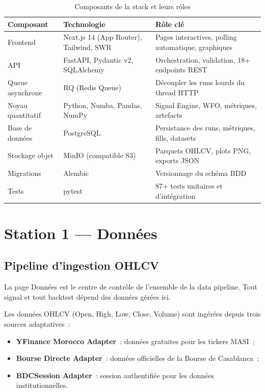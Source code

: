 \begin{table}[H]
\centering
\caption{Composants de la stack et leurs rôles}
\label{tab:stack_detail}
\begin{tabularx}{\linewidth}{@{}lYY@{}}
\toprule
\textbf{Composant}        & \textbf{Technologie}             & \textbf{Rôle clé} \\
\midrule
Frontend                  & Next.js 14 (App Router), Tailwind, SWR & Pages interactives, polling automatique, graphiques \\
API                       & FastAPI, Pydantic v2, SQLAlchemy & Orchestration, validation, 18+ endpoints REST \\
Queue asynchrone          & RQ (Redis Queue)                 & Découpler les runs lourds du thread HTTP \\
Noyau quantitatif         & Python, Numba, Pandas, NumPy     & Signal Engine, WFO, métriques, artefacts \\
Base de données           & PostgreSQL                       & Persistance des runs, métriques, fills, datasets \\
Stockage objet            & MinIO (compatible S3)            & Parquets OHLCV, plots PNG, exports JSON \\
Migrations                & Alembic                          & Versionnage du schéma BDD \\
Tests                     & pytest                           & 87+ tests unitaires et d'intégration \\
\bottomrule
\end{tabularx}
\end{table}

\section{Station 1 --- Données}
\label{sec:station_data}

\subsection{Pipeline d'ingestion OHLCV}

La page Données est le centre de contrôle de l'ensemble de la data pipeline.
Tout signal et tout backtest dépend des données gérées ici.

Les données OHLCV (Open, High, Low, Close, Volume) sont ingérées depuis trois
sources adaptatives~:

\begin{itemize}
    \item \textbf{YFinance Morocco Adapter}~: données gratuites pour les tickers MASI~;
    \item \textbf{Bourse Directe Adapter}~: données officielles de la Bourse de Casablanca~;
    \item \textbf{BDCSession Adapter}~: session authentifiée pour les données institutionnelles.
\end{itemize}


